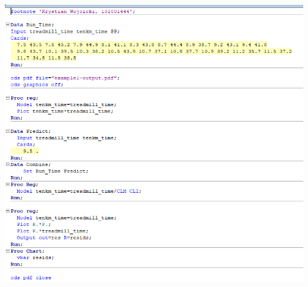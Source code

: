 \documentclass{article}
\begin{document}
\begin{center}
	\includegraphics{a2_sascode}
\end{center}
\end{document}
